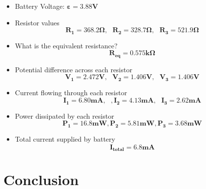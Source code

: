 \documentclass[titlepage]{article}
\begin{document}
    \begin{itemize} 
        \item Battery Voltage: $\mathbf{\varepsilon = 3.88V }$ 
        \item Resistor values $$\mathbf{R_1 =368.2\Omega, \text{     } R_2 = 328.7 \Omega , \text{      } R_3 = 521.9 \Omega }$$
        \item What is the equivalent resistance?\\ $$\mathbf{ R_{eq} = 0.575k \Omega}$$

        \item Potential difference across each resistor
        $$\mathbf{V_1 = 2.472V, \text{    } V_2 = 1.406V, \text{    } V_3 = 1.406V}$$
        \item Current flowing through each resistor 
            $$\mathbf{ I_1 = 6.80 mA, \text{   }, I_2 = 4.13 mA, \text{    } I_3 = 2.62 mA }$$
        \item Power dissipated by each resistor 
            $$\mathbf{ P_1 = 16.8mW, P_2 = 5.81 mW, P_3 = 3.68mW }$$
        \item Total current supplied by battery
            $$\mathbf{I_\text{total} = 6.8 mA}$$
    \end{itemize}




	\section{Conclusion}
\end{document}
